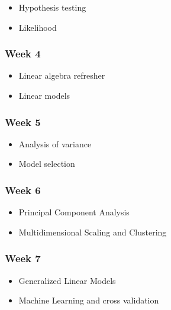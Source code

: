\documentclass[
  letterpaper,
  DIV=11,
  numbers=noendperiod]{scrreprt}
\providecommand{\tightlist}{%
  \setlength{\itemsep}{0pt}\setlength{\parskip}{0pt}}\usepackage{longtable,booktabs,array}
\begin{document}
\begin{itemize}
\tightlist
\item
  Hypothesis testing
\item
  Likelihood
\end{itemize}

\hypertarget{week-4}{%
\subsubsection*{Week 4}\label{week-4}}

\begin{itemize}
\tightlist
\item
  Linear algebra refresher
\item
  Linear models
\end{itemize}

\hypertarget{week-5}{%
\subsubsection*{Week 5}\label{week-5}}

\begin{itemize}
\tightlist
\item
  Analysis of variance
\item
  Model selection
\end{itemize}

\hypertarget{week-6}{%
\subsubsection*{Week 6}\label{week-6}}

\begin{itemize}
\tightlist
\item
  Principal Component Analysis
\item
  Multidimensional Scaling and Clustering
\end{itemize}

\hypertarget{week-7}{%
\subsubsection*{Week 7}\label{week-7}}

\begin{itemize}
\tightlist
\item
  Generalized Linear Models
\item
  Machine Learning and cross validation
\end{itemize}
\end{document}
